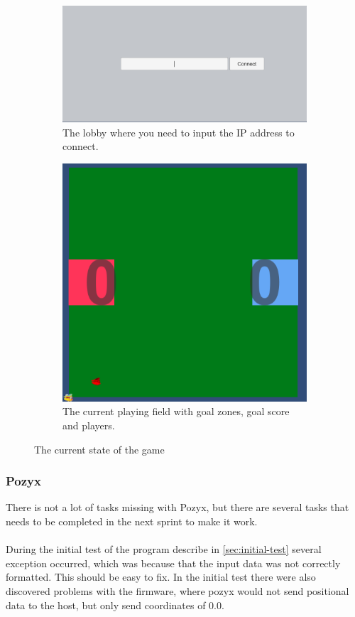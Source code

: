 \begin{figure}[H]
    \centering
    \begin{subfigure}{.5\textwidth}
        \centering
        \includegraphics[width=1\linewidth]{figures/sprint-4-lobby.PNG}
        \caption{The lobby where you need to input the IP address to connect.}
        \label{fig:sprint-4-lobby}
    \end{subfigure}
    \begin{subfigure}{.4\textwidth}
        \centering
        \includegraphics[width=.8\linewidth]{figures/sprint-4-game.PNG}
        \caption{The current playing field with goal zones, goal score and players.}
        \label{fig:sprint-4-game}
    \end{subfigure}
    \caption{The current state of the game}
    \label{fig:sprint-4-state-of-game}
\end{figure}

\subsubsection{Pozyx}
There is not a lot of tasks missing with Pozyx, but there are several tasks that needs to be completed in the next sprint to make it work.
\\\\
During the initial test of the program describe in \autoref{sec:initial-test} several exception occurred, which was because that the input data was not correctly formatted.
This should be easy to fix.
In the initial test there were also discovered problems with the firmware, where pozyx would not send positional data to the host, but only send coordinates of 0.0.

